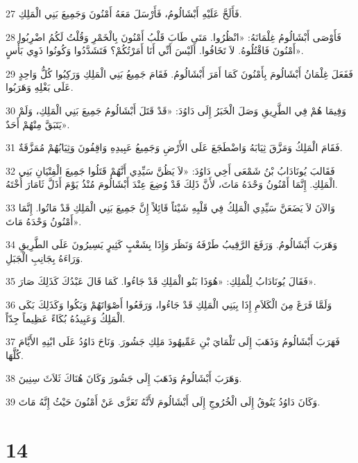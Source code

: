 \par 27 فَأَلَحَّ عَلَيْهِ أَبْشَالُومُ، فَأَرْسَلَ مَعَهُ أَمْنُونَ وَجَمِيعَ بَنِي الْمَلِكِ.
\par 28 فَأَوْصَى أَبْشَالُومُ غِلْمَانَهُ: «انْظُرُوا. مَتَى طَابَ قَلْبُ أَمْنُونَ بِالْخَمْرِ وَقُلْتُ لَكُمُ اضْرِبُوا أَمْنُونَ فَاقْتُلُوهُ. لاَ تَخَافُوا. أَلَيْسَ أَنِّي أَنَا أَمَرْتُكُمْ؟ فَتَشَدَّدُوا وَكُونُوا ذَوِي بَأْسٍ».
\par 29 فَفَعَلَ غِلْمَانُ أَبْشَالُومَ بِأَمْنُونَ كَمَا أَمَرَ أَبْشَالُومُ. فَقَامَ جَمِيعُ بَنِي الْمَلِكِ وَرَكِبُوا كُلُّ وَاحِدٍ عَلَى بَغْلِهِ وَهَرَبُوا.
\par 30 وَفِيمَا هُمْ فِي الطَّرِيقِ وَصَلَ الْخَبَرُ إِلَى دَاوُدَ: «قَدْ قَتَلَ أَبْشَالُومُ جَمِيعَ بَنِي الْمَلِكِ، وَلَمْ يَتَبَقَّ مِنْهُمْ أَحَدٌ».
\par 31 فَقَامَ الْمَلِكُ وَمَزَّقَ ثِيَابَهُ وَاضْطَجَعَ عَلَى الأَرْضِ وَجَمِيعُ عَبِيدِهِ وَاقِفُونَ وَثِيَابُهُمْ مُمَزَّقَةٌ.
\par 32 فَقَالبَ يُونَادَابُ بْنُ شَمْعَى أَخِي دَاوُدَ: «لاَ يَظُنَّ سَيِّدِي أَنَّهُمْ قَتَلُوا جَمِيعَ الْفِتْيَانِ بَنِي الْمَلِكِ. إِنَّمَا أَمْنُونُ وَحْدَهُ مَاتَ، لأَنَّ ذَلِكَ قَدْ وُضِعَ عِنْدَ أَبْشَالُومَ مُنْذُ يَوْمَ أَذَلَّ ثَامَارَ أُخْتَهُ.
\par 33 وَالآنَ لاَ يَضَعَنَّ سَيِّدِي الْمَلِكُ فِي قَلْبِهِ شَيْئاً قَائِلاً إِنَّ جَمِيعَ بَنِي الْمَلِكِ قَدْ مَاتُوا. إِنَّمَا أَمْنُونُ وَحْدَهُ مَاتَ».
\par 34 وَهَرَبَ أَبْشَالُومُ. وَرَفَعَ الرَّقِيبُ طَرْفَهُ وَنَظَرَ وَإِذَا بِشَعْبٍ كَثِيرٍ يَسِيرُونَ عَلَى الطَّرِيقِ وَرَاءَهُ بِجَانِبِ الْجَبَلِ.
\par 35 فَقَالَ يُونَادَابُ لِلْمَلِكِ: «هُوَذَا بَنُو الْمَلِكِ قَدْ جَاءُوا. كَمَا قَالَ عَبْدُكَ كَذَلِكَ صَارَ».
\par 36 وَلَمَّا فَرَغَ مِنَ الْكَلاَمِ إِذَا بِبَنِي الْمَلِكِ قَدْ جَاءُوا، وَرَفَعُوا أَصْوَاتَهُمْ وَبَكُوا وَكَذَلِكَ بَكَى الْمَلِكُ وَعَبِيدُهُ بُكَاءً عَظِيماً جِدّاً.
\par 37 فَهَرَبَ أَبْشَالُومُ وَذَهَبَ إِلَى تَلْمَايَ بْنِ عَمِّيهُودَ مَلِكِ جَشُورَ. وَنَاحَ دَاوُدُ عَلَى ابْنِهِ الأَيَّامَ كُلَّهَا.
\par 38 وَهَرَبَ أَبْشَالُومُ وَذَهَبَ إِلَى جَشُورَ وَكَانَ هُنَاكَ ثَلاَثَ سِنِينَ.
\par 39 وَكَانَ دَاوُدُ يَتُوقُ إِلَى الْخُرُوجِ إِلَى أَبْشَالُومَ لأَنَّهُ تَعَزَّى عَنْ أَمْنُونَ حَيْثُ إِنَّهُ مَاتَ.

\chapter{14}

